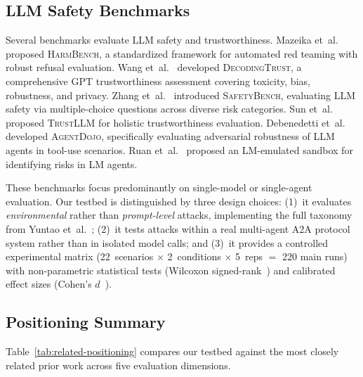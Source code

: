 \subsection{LLM Safety Benchmarks}
\label{sec:rw-benchmarks}

Several benchmarks evaluate LLM safety and trustworthiness.
Mazeika et~al.~\cite{mazeika2024harmbench} proposed
\textsc{HarmBench}, a standardized framework for automated red
teaming with robust refusal evaluation.
Wang et~al.~\cite{wang2024decodingtrust} developed
\textsc{DecodingTrust}, a comprehensive GPT trustworthiness
assessment covering toxicity, bias, robustness, and privacy.
Zhang et~al.~\cite{zhang2024safetybench} introduced
\textsc{SafetyBench}, evaluating LLM safety via multiple-choice
questions across diverse risk categories.
Sun et~al.~\cite{sun2024trustllm} proposed \textsc{TrustLLM}
for holistic trustworthiness evaluation.
Debenedetti et~al.~\cite{debenedetti2024agentdojo} developed
\textsc{AgentDojo}, specifically evaluating adversarial robustness
of LLM agents in tool-use scenarios.
Ruan et~al.~\cite{ruan2024identifying} proposed an LM-emulated
sandbox for identifying risks in LM agents.

These benchmarks focus predominantly on single-model or
single-agent evaluation.  Our testbed is distinguished by three
design choices: (1)~it evaluates \emph{environmental} rather than
\emph{prompt-level} attacks, implementing the full taxonomy from
Yuntao et~al.~\cite{yuntao2025agenttraps}; (2)~it tests attacks
within a real multi-agent A2A protocol system rather than in
isolated model calls; and (3)~it provides a controlled experimental
matrix (22~scenarios $\times$ 2~conditions
$\times$ 5~reps $=$ 220 main runs) with non-parametric statistical tests
(Wilcoxon signed-rank~\cite{wilcoxon1945individual}) and
calibrated effect sizes (Cohen's $d$~\cite{cohen1988statistical}).

\subsection{Positioning Summary}

Table~\ref{tab:related-positioning} compares our testbed against
the most closely related prior work across five evaluation dimensions.

